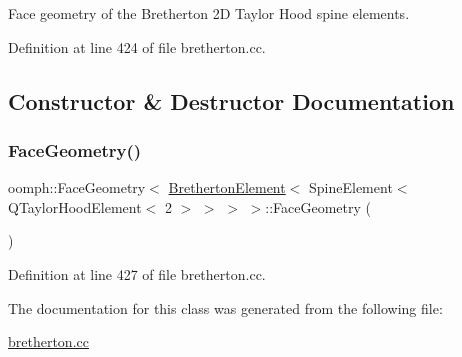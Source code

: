 Face geometry of the Bretherton 2D Taylor Hood spine elements. 

Definition at line 424 of file bretherton.\+cc.



\subsection{Constructor \& Destructor Documentation}
\mbox{\label{classoomph_1_1FaceGeometry_3_01BrethertonElement_3_01SpineElement_3_01QTaylorHoodElement_3_012_01_4_01_4_01_4_01_4_a7dd07e5dd24aaca5c44a36cfedb04c3e}} 
\subsubsection{\texorpdfstring{Face\+Geometry()}{FaceGeometry()}}
{\footnotesize\ttfamily oomph\+::\+Face\+Geometry$<$ \hyperlink{classBrethertonElement}{Bretherton\+Element}$<$ Spine\+Element$<$ Q\+Taylor\+Hood\+Element$<$ 2 $>$ $>$ $>$ $>$\+::Face\+Geometry (\begin{DoxyParamCaption}{ }\end{DoxyParamCaption})\hspace{0.3cm}{\ttfamily [inline]}}



Definition at line 427 of file bretherton.\+cc.



The documentation for this class was generated from the following file\+:\begin{DoxyCompactItemize}
\item 
\hyperlink{bretherton_8cc}{bretherton.\+cc}\end{DoxyCompactItemize}
